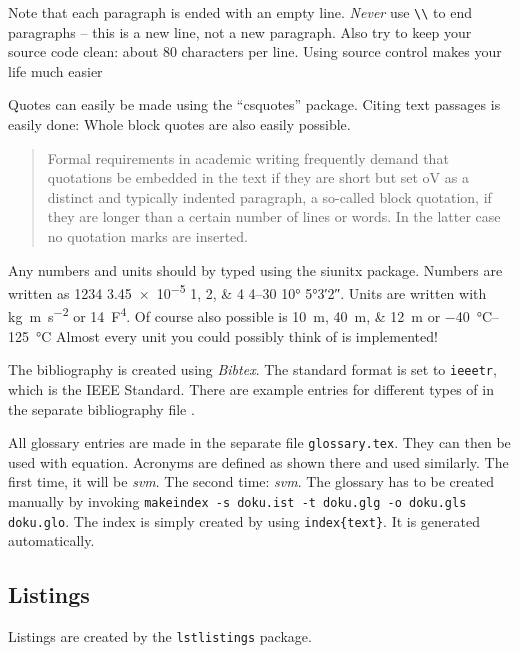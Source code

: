 %
Note that each paragraph is ended with an empty line. 
\emph{Never} use \verb|\\| to end paragraphs -- this is a new line, not a new paragraph.
Also try to keep your source code clean: about 80 characters per line.
Using source control makes your life much easier

%
Quotes can easily be made using the \enquote{csquotes} package.
Citing text passages is easily done:  Whole block quotes are also easily 
possible.

\blockquote{Formal requirements in academic writing frequently demand that
    quotations be embedded in the text if they are short but set oV as a distinct
    and typically indented paragraph, a so-called block quotation, if they are
    longer than a certain number of lines or words. In the latter case no quotation
    marks are inserted.}

%
Any numbers and units should by typed using the siunitx package.
Numbers are written as \num{1234} \num{3.45e-5} \numlist{1;2;4} \numrange{4}{30} \ang{10} \ang{5;3;2}.
Units are written with \si{\kilo\gram\meter\per\square\second} or \SI{14}{\farad\tothe{4}}.
Of course also possible is \SIlist{10;40;12}{\meter} or \SIrange{-40}{+125}{\degreeCelsius}
Almost every unit you could possibly think of is implemented!

%
The bibliography is created using \emph{Bibtex}. The
standard format is set to \texttt{ieeetr}, which is the IEEE Standard. There
are example entries for different types of  in the separate bibliography file
\cite{article} \cite{book} \cite{booklet} \cite{conference} \cite{inbook}
\cite{incollection} \cite{manual} \cite{mastersthesis} \cite{misc}
\cite{phdthesis} \cite{proceedings} \cite{techreport} \cite{unpublished}.

%
All glossary entries are made in the separate file \texttt{glossary.tex}.
They can then be used with \gls{equation}.
Acronyms are defined as shown there and used similarly. 
The first time, it will be \emph{\gls{svm}}.
The second time: \emph{\gls{svm}}.
The glossary has to be created manually by invoking \texttt{makeindex -s doku.ist -t doku.glg -o doku.gls doku.glo}.
The index is simply created by using \texttt{index\{text\}}. It is generated automatically.

\subsection{Listings}
Listings are created by the \texttt{lstlistings} package.